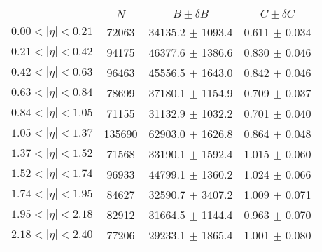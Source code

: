 \begin{tabular}{lccc}
\hline
    &   $N$   & $B \pm \delta B$  &  $C \pm \delta C$ \\
\hline
$0.00 < |\eta| <0.21$          & 72063      & 34135.2    $\pm$ 1093.4 & 0.611      $\pm$ 0.034 \\
$0.21 < |\eta| <0.42$          & 94175      & 46377.6    $\pm$ 1386.6 & 0.830      $\pm$ 0.046 \\
$0.42 < |\eta| <0.63$          & 96463      & 45556.5    $\pm$ 1643.0 & 0.842      $\pm$ 0.046 \\
$0.63 < |\eta| <0.84$          & 78699      & 37180.1    $\pm$ 1154.9 & 0.709      $\pm$ 0.037 \\
$0.84 < |\eta| <1.05$          & 71155      & 31132.9    $\pm$ 1032.2 & 0.701      $\pm$ 0.040 \\
$1.05 < |\eta| <1.37$          & 135690     & 62903.0    $\pm$ 1626.8 & 0.864      $\pm$ 0.048 \\
$1.37 < |\eta| <1.52$          & 71568      & 33190.1    $\pm$ 1592.4 & 1.015      $\pm$ 0.060 \\
$1.52 < |\eta| <1.74$          & 96933      & 44799.1    $\pm$ 1360.2 & 1.024      $\pm$ 0.066 \\
$1.74 < |\eta| <1.95$          & 84627      & 32590.7    $\pm$ 3407.2 & 1.009      $\pm$ 0.071 \\
$1.95 < |\eta| <2.18$          & 82912      & 31664.5    $\pm$ 1144.4 & 0.963      $\pm$ 0.070 \\
$2.18 < |\eta| <2.40$          & 77206      & 29233.1    $\pm$ 1865.4 & 1.001      $\pm$ 0.080 \\
\hline
\end{tabular}
